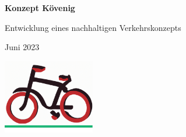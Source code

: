 \documentclass{article}
\begin{document}
	\begin{titlepage}
		\centering
		\vspace*{2cm}
		{\Huge\bfseries Konzept Kövenig\par}
		\vspace{1cm}
		{\Large Entwicklung eines nachhaltigen Verkehrskonzepts}
		\vfill
		{\large Juni 2023\par}
		\vspace*{1cm}
		\includegraphics[width=0.3\textwidth]{logo.png}
	\end{titlepage}
	
	\tableofcontents
	
        
         
        
        
        
        
	 
	
\end{document}
